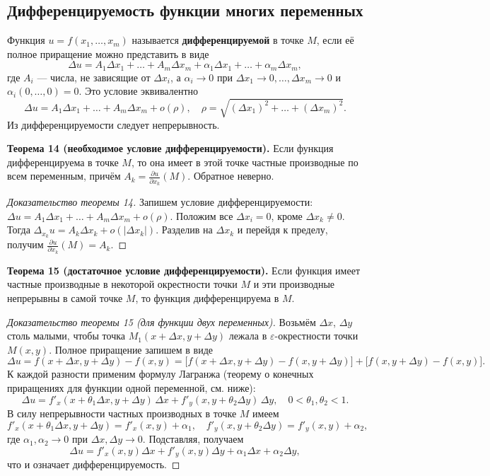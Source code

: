 \documentclass{article}
\theoremstyle{definition}
\begin{document}
\subsection{Дифференцируемость функции многих переменных}
Функция $u=f(x_1,\dots,x_m)$ называется \textbf{дифференцируемой} в точке $M$, если её полное приращение можно представить в виде
\[
\Delta u = A_1\Delta x_1+\dots+A_m\Delta x_m + \alpha_1\Delta x_1+\dots+\alpha_m\Delta x_m,
\]
где $A_i$ — числа, не зависящие от $\Delta x_i$, а $\alpha_i\to0$ при $\Delta x_1\to0,\dots,\Delta x_m\to0$ и $\alpha_i(0,\dots,0)=0$. Это условие эквивалентно
\[
\Delta u = A_1\Delta x_1+\dots+A_m\Delta x_m + o(\rho),\quad \rho=\sqrt{(\Delta x_1)^2+\dots+(\Delta x_m)^2}.
\]
Из дифференцируемости следует непрерывность.

\textbf{Теорема 14 (необходимое условие дифференцируемости).} Если функция дифференцируема в точке $M$, то она имеет в этой точке частные производные по всем переменным, причём $A_k=\frac{\partial u}{\partial x_k}(M)$. Обратное неверно.

\begin{proof}[Доказательство теоремы 14]
Запишем условие дифференцируемости: $\Delta u = A_1\Delta x_1+\dots+A_m\Delta x_m+o(\rho)$. Положим все $\Delta x_i=0$, кроме $\Delta x_k\neq0$. Тогда $\Delta_{x_k}u = A_k\Delta x_k + o(|\Delta x_k|)$. Разделив на $\Delta x_k$ и перейдя к пределу, получим $\frac{\partial u}{\partial x_k}(M)=A_k$.
\end{proof}

\textbf{Теорема 15 (достаточное условие дифференцируемости).} Если функция имеет частные производные в некоторой окрестности точки $M$ и эти производные непрерывны в самой точке $M$, то функция дифференцируема в $M$.

\begin{proof}[Доказательство теоремы 15 (для функции двух переменных)]
Возьмём $\Delta x$, $\Delta y$ столь малыми, чтобы точка $M_1(x+\Delta x,y+\Delta y)$ лежала в $\varepsilon$-окрестности точки $M(x,y)$. Полное приращение запишем в виде
\[
\Delta u = f(x+\Delta x,y+\Delta y)-f(x,y) = \bigl[f(x+\Delta x,y+\Delta y)-f(x,y+\Delta y)\bigr] + \bigl[f(x,y+\Delta y)-f(x,y)\bigr].
\]
К каждой разности применим формулу Лагранжа (теорему о конечных приращениях для функции одной переменной, см. ниже):
\[
\Delta u = f'_x(x+\theta_1\Delta x, y+\Delta y)\,\Delta x + f'_y(x, y+\theta_2\Delta y)\,\Delta y,\quad 0<\theta_1,\theta_2<1.
\]
В силу непрерывности частных производных в точке $M$ имеем
\[
f'_x(x+\theta_1\Delta x, y+\Delta y)=f'_x(x,y)+\alpha_1,\quad f'_y(x, y+\theta_2\Delta y)=f'_y(x,y)+\alpha_2,
\]
где $\alpha_1,\alpha_2\to0$ при $\Delta x,\Delta y\to0$. Подставляя, получаем
\[
\Delta u = f'_x(x,y)\Delta x + f'_y(x,y)\Delta y + \alpha_1\Delta x + \alpha_2\Delta y,
\]
что и означает дифференцируемость.
\end{proof}
\end{document}
